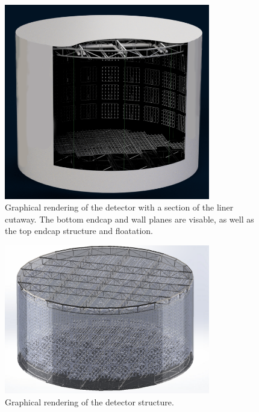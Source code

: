 \begin{figure} %
    \includegraphics[width=0.8\textwidth]{diagrams/5-chips/chips_render_1.png}
    \caption[Graphical rendering of the \chipsfive detector with liner cutaway.]
    {Graphical rendering of the \chipsfive detector with a section of the liner cutaway.
        The bottom endcap and wall planes are visable,
        as well as the top endcap structure and floatation.}
    \label{fig:chips_render_1}
\end{figure} %

\begin{figure} %
    \includegraphics[width=0.8\textwidth]{diagrams/5-chips/chips_render_2.png}
    \caption[Graphical rendering of the \chipsfive detector structure.]
    {Graphical rendering of the \chipsfive detector structure.}
    \label{fig:chips_render_2}
\end{figure} %

